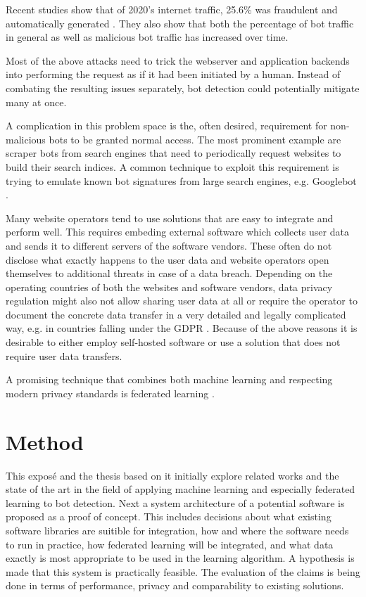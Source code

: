 \documentclass[
    fontsize=12pt,
    headings=small,
    parskip=half,           %
    bibliography=totoc,
    numbers=noenddot,       %
    open=any,               %
    ]{scrreprt}
\begin{document}
Recent studies show that of 2020's internet traffic, 25.6\% was fraudulent and automatically generated \cite{BAD_BOT_REPORT2020} \cite{BAD_BOT_REPORT2021}. They also show that both the percentage of bot traffic in general as well as malicious bot traffic has increased over time.

Most of the above attacks need to trick the webserver and application backends into performing the request as if it had been initiated by a human. Instead of combating the resulting issues separately, bot detection could potentially mitigate many at once.

A complication in this problem space is the, often desired, requirement for non-malicious bots to be granted normal access. The most prominent example are scraper bots from search engines that need to periodically request websites to build their search indices. A common technique to exploit this requirement is trying to emulate known bot signatures from large search engines, e.g. Googlebot \cite{TODO}.

Many website operators tend to use solutions that are easy to integrate and perform well. This requires embeding external software which collects user data and sends it to different servers of the software vendors. These often do not disclose what exactly happens to the user data and website operators open themselves to additional threats in case of a data breach. Depending on the operating countries of both the websites and software vendors, data privacy regulation might also not allow sharing user data at all or require the operator to document the concrete data transfer in a very detailed and legally complicated way, e.g. in countries falling under the GDPR \cite{GDPR}. Because of the above reasons it is desirable to either employ self-hosted software or use a solution that does not require user data transfers.


A promising technique that combines both machine learning and respecting modern privacy standards is federated learning \cite{DBLP:journals/corr/KonecnyMR15} \cite{DBLP:journals/corr/KonecnyMRR16}.

\chapter{Method}

This exposé and the thesis based on it initially explore related works and the state of the art in the field of applying machine learning and especially federated learning to bot detection. Next a system architecture of a potential software is proposed as a proof of concept. This includes decisions about what existing software libraries are suitible for integration, how and where the software needs to run in practice, how federated learning will be integrated, and what data exactly is most appropriate to be used in the learning algorithm. A hypothesis is made that this system is practically feasible. The evaluation of the claims is being done in terms of performance, privacy and comparability to existing solutions.
\end{document}
